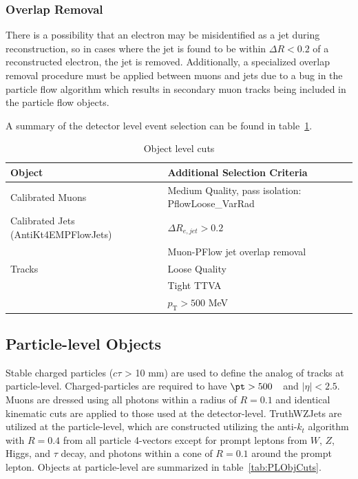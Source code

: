 \subsubsection{Overlap Removal}

There is a possibility that an electron may be misidentified as a jet during reconstruction, so in cases where the jet is found to be within $\Delta R < 0.2$ of a reconstructed electron, the jet is removed.
Additionally, a specialized overlap removal procedure must be applied between muons and jets due to a bug in the particle flow algorithm which results in secondary muon tracks being included in the particle flow objects.

A summary of the detector level event selection can be found in table~\ref{tab:ObjCuts}.


\begin{table}[h!]
    \centering
    \begin{tabular}{l|l}
    \hline
     \textbf{Object} & \textbf{Additional Selection Criteria} \\ \hline
     Calibrated Muons & Medium Quality, pass isolation: PflowLoose\_VarRad \\ \hline
     Calibrated Jets (AntiKt4EMPFlowJets) & $\Delta R_{e,jet} > 0.2$ \\
      & Muon-PFlow jet overlap removal \\ \hline
     Tracks & Loose Quality \\
      & Tight TTVA \\
      & $p_{\text{T}} > 500$ MeV \\ \hline
    \end{tabular}
    \caption{Object level cuts}
    \label{tab:ObjCuts}
\end{table}

\subsection{Particle-level Objects}

Stable charged particles ($c\tau$ > 10 mm) are used to define the analog of tracks at particle-level. Charged-particles are required to have $\pt > 500$~\MeV~and $|\eta|<2.5$.
Muons are dressed using all photons within a radius of $R=0.1$ and identical kinematic cuts are applied to those used at the detector-level.
TruthWZJets are utilized at the particle-level, which are constructed utilizing the anti-$k_t$ algorithm with $R=0.4$ from all particle 4-vectors except for prompt leptons from $W$, $Z$, Higgs, and $\tau$ decay, and photons within a cone of $R=0.1$ around the prompt lepton.
Objects at particle-level are summarized in table~\ref{tab:PLObjCuts}.

